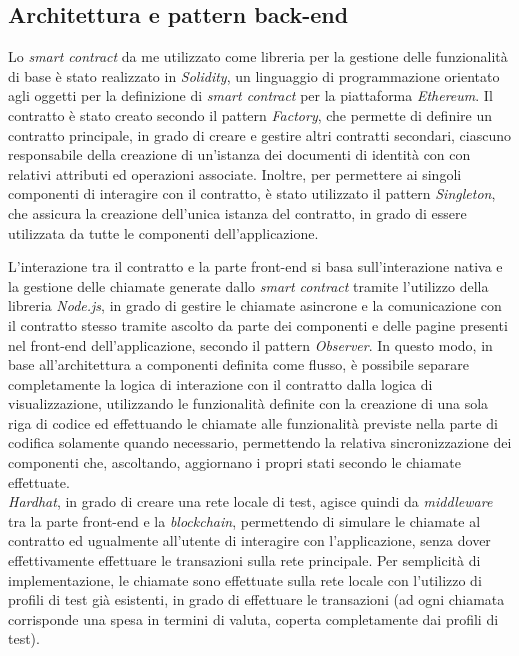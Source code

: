 \subsection{Architettura e pattern back-end}
Lo \textit{smart contract} da me utilizzato come libreria per la gestione delle funzionalità di base è stato realizzato in \textit{Solidity}, un linguaggio di programmazione
orientato agli oggetti per la definizione di \textit{smart contract} per la piattaforma \textit{Ethereum}. 
Il contratto è stato creato secondo il pattern \textit{Factory}, che permette di definire un contratto principale, in grado di creare e gestire altri contratti secondari,
ciascuno responsabile della creazione di un'istanza dei documenti di identità con  con relativi attributi ed operazioni associate.
Inoltre, per permettere ai singoli componenti di interagire con il contratto, è stato utilizzato il pattern \textit{Singleton}, che assicura la creazione dell'unica istanza
del contratto, in grado di essere utilizzata da tutte le componenti dell'applicazione. \\

\clearpage

L'interazione tra il contratto e la parte front-end si basa sull'interazione nativa e la gestione delle chiamate generate dallo \textit{smart contract} tramite l'utilizzo
della libreria \textit{Node.js}, in grado di gestire le chiamate asincrone e la comunicazione con il contratto stesso tramite ascolto da parte dei componenti e delle pagine
presenti nel front-end dell'applicazione, secondo il pattern \textit{Observer}. 
In questo modo, in base all'architettura a componenti definita come flusso, è possibile separare completamente la logica di interazione con il contratto dalla logica di visualizzazione,
utilizzando le funzionalità definite con la creazione di una sola riga di codice ed effettuando le chiamate alle funzionalità previste nella parte di codifica 
solamente quando necessario, permettendo la relativa sincronizzazione dei componenti che, ascoltando, aggiornano i propri stati secondo le chiamate effettuate. \\

\textit{Hardhat}, in grado di creare una rete locale di test, agisce quindi da \textit{middleware} tra la parte front-end e la \textit{blockchain}, permettendo di simulare le chiamate al contratto
ed ugualmente all'utente di interagire con l'applicazione, senza dover effettivamente effettuare le transazioni sulla rete principale.
Per semplicità di implementazione, le chiamate sono effettuate sulla rete locale con l'utilizzo di profili di test già esistenti, in grado di effettuare le transazioni (ad ogni chiamata
corrisponde una spesa in termini di valuta, coperta completamente dai profili di test). \\

